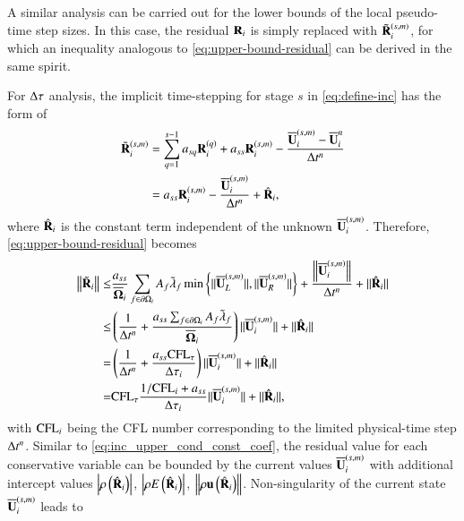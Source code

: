 A similar analysis can be carried out for the lower bounds of the local pseudo-time step sizes. In this case, the residual $\mathbf{R}_i$ is simply replaced with $\tilde{\mathbf{R}}_i^{(s,m)}$, for which an inequality analogous to \eqref{eq:upper-bound-residual} can be derived in the same spirit. 

For $\mathrm\Delta\tau$ analysis, 
the implicit time-stepping  for stage $s$ in \eqref{eq:define-inc}
has the form of
\begin{equation}
    \begin{aligned}
        \tilde{\mathbf{R}}_i^{\left(s,m\right)} & = \sum_{q=1}^{s-1} a_{sq} \mathbf{R}_i^{\left(q\right)} + 
    a_{ss} \mathbf{R}_i^{\left(s,m\right)} - 
    \dfrac{\overline{\mathbf{U}}_i^{\left(s,m\right)} - \overline{\mathbf{U}}_i^{n}}{\mathrm\Delta t^n} \\
    & =  a_{ss} \mathbf{R}_i^{\left(s,m\right)} - 
    \dfrac{\overline{\mathbf{U}}_i^{\left(s,m\right)}}{\mathrm\Delta t^n}
    + \hat{\mathbf{R}}_i,
    \end{aligned}
\end{equation}
where $\hat{\mathbf{R}}_i$ is the constant term independent of the unknown
$\overline{\mathbf{U}}_i^{\left(s,m\right)}$. 
Therefore, \eqref{eq:upper-bound-residual} becomes
\begin{equation}
\label{eq:upper-bound-residual-tau}
\begin{aligned}
    \left\| \tilde{\mathbf{R}}_i \right\| 
    \leq & \frac{a_{ss}}{\overline{\mathbf{\Omega}}_i} \sum_{f \in \partial \Omega_i}{
        A_{f} \tilde{\lambda}_{f} \min \left\{\|\overline{\mathbf{U}}_L^{\left(s,m\right)}\|, \|\overline{\mathbf{U}}_R^{\left(s,m\right)}\| \right\}
    } 
    + \dfrac{\left\|\overline{\mathbf{U}}_i^{\left(s,m\right)}\right\|}{\mathrm\Delta t^n}
    + \|\hat{\mathbf{R}}_i\|
    \\
    \leq & \left(
    \frac{1}{\mathrm\Delta t^n} + 
    \frac{a_{ss}\sum_{f \in \partial \Omega_i} A_f\tilde{\lambda}_f}{\overline{\mathbf{\Omega}}_i}
    \right)
    \|\overline{\mathbf{U}}_i^{\left(s,m\right)}\|
    + \|\hat{\mathbf{R}}_i\|\\
    = &
    \left(\frac{1}{\mathrm\Delta t^n} + \frac{a_{ss}\text{CFL}_\tau}{\mathrm\Delta \tau_i} \right)\|\overline{\mathbf{U}}_i^{\left(s,m\right)}\| 
    + \|\hat{\mathbf{R}}_i\|\\
    = &
     \text{CFL}_\tau\frac{1 / \text{CFL}_i + a_{ss}}{\mathrm\Delta \tau_i}
     \|\overline{\mathbf{U}}_i^{\left(s,m\right)}\| 
    + \|\hat{\mathbf{R}}_i\|,
\end{aligned}
\end{equation}
with $\text{CFL}_i$ being the CFL number corresponding to the limited
physical-time step
$\mathrm\Delta t^n$.
Similar to \eqref{eq:inc_upper_cond_const_coef}, 
the residual value for each conservative variable can be 
bounded by the current values $\overline{\mathbf{U}}_i^{\left(s,m\right)}$ with additional 
intercept values $\left| \rho\left(\hat{\mathbf{R}}_i\right) \right|$, 
$\left | \rho E\left(\hat{\mathbf{R}}_i\right) \right|$, 
$\left\|\rho\mathbf{u}\left(\hat{\mathbf{R}}_i\right) \right\|$. 
Non-singularity of the current state $\overline{\mathbf{U}}_i^{\left(s,m\right)}$ leads to 

